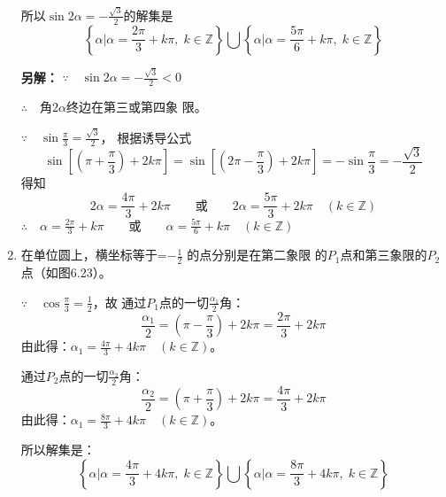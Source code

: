 \begin{solution}
\begin{enumerate}
所以$\sin2\alpha=-\frac{\sqrt{3}}{2}$的解集是
\[\left\{\alpha\Big|\alpha=\frac{2\pi}{3}+k\pi,\; k\in\mathbb{Z}\right\}\bigcup \left\{\alpha\Big|\alpha=\frac{5\pi}{6}+k\pi,\; k\in\mathbb{Z}\right\}\]

\textbf{另解：}
$\because\quad \sin2\alpha=-\frac{\sqrt{3}}{2}<0$

$\therefore\quad$角$ 2\alpha$终边在第三或第四象
限。

$\because\quad \sin\frac{\pi}{3}=\frac{\sqrt{3}}{2}$，
根据诱导公式
\[\sin\left[\left(\pi+\frac{\pi}{3}\right)+2k\pi\right]=\sin\left[\left(2\pi-\frac{\pi}{3}\right)+2k\pi\right]=-\sin\frac{\pi}{3}=-\frac{\sqrt{3}}{2}\]
得知
\[2\alpha=\frac{4\pi}{3}+2k\pi\qquad \text{或}\qquad 2\alpha=\frac{5\pi}{3}+2k\pi\quad (k\in\mathbb{Z})\]
$\therefore\quad \alpha=\frac{2\pi}{3}+k\pi\qquad \text{或}\qquad \alpha=\frac{5\pi}{6}+k\pi\quad (k\in\mathbb{Z})$

\item 在单位圆上，横坐标等于=$-\frac{1}{2}$
的点分别是在第二象限
的$P_1$点和第三象限的$P_2$点（如图6.23）。

\begin{figure}[htp]
    \centering
{}
    \caption{}
\end{figure}


$\because\quad \cos\frac{\pi}{3}=\frac{1}{2}$，故
通过$P_1$点的一切$\frac{\alpha_1}{2}$角：
\[\frac{\alpha_1}{2}=\left(\pi-\frac{\pi}{3}\right)+2k\pi=\frac{2\pi}{3}+2k\pi\]
由此得：$\alpha_1=\frac{4\pi}{3}+4k\pi\quad (k\in\mathbb{Z})$。

通过$P_2$点的一切$\frac{\alpha_2}{2}$角：
\[\frac{\alpha_2}{2}=\left(\pi+\frac{\pi}{3}\right)+2k\pi=\frac{4\pi}{3}+2k\pi\]
由此得：$\alpha_1=\frac{8\pi}{3}+4k\pi\quad (k\in\mathbb{Z})$。

所以解集是：
\[\left\{\alpha\Big|\alpha=\frac{4\pi}{3}+4k\pi,\; k\in\mathbb{Z}\right\}\bigcup \left\{\alpha\Big|\alpha=\frac{8\pi}{3}+4k\pi,\; k\in\mathbb{Z}\right\}\]


\end{enumerate}
\end{solution}
